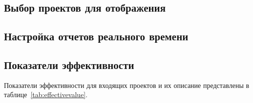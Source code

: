 

\subsection{Выбор проектов для отображения}
\label{subsec:выбор-проектов-для-отображения}

\subsection{Настройка отчетов реального времени}\label{subsec:настройка-отчетов-реального-времени}

\subsection{Показатели эффективности}\label{subsec:показатели-эффективности}

Показатели эффективности для входящих проектов и их описание представлены в таблице~\ref{tab:effectivevalue}.

